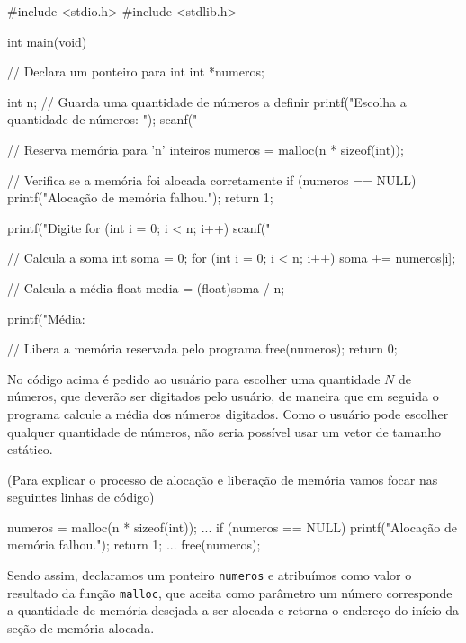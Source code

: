 \newpage
\begin{excode}
    #include <stdio.h>
    #include <stdlib.h>

    int main(void)
    {
        // Declara um ponteiro para int
        int *numeros;
        
        int n; // Guarda uma quantidade de números a definir
        printf("Escolha a quantidade de números: ");
        scanf("%
        
        // Reserva memória para 'n' inteiros
        numeros = malloc(n * sizeof(int));
        
        // Verifica se a memória foi alocada corretamente
        if (numeros == NULL) {
            printf("Alocação de memória falhou.\n");
            return 1;
        }
        
        printf("Digite %
        for (int i = 0; i < n; i++) {
            scanf("%
        }
        
        // Calcula a soma
        int soma = 0;
        for (int i = 0; i < n; i++) {
            soma += numeros[i];
        }
        
        // Calcula a média
        float media = (float)soma / n;
        
        printf("Média: %
        
        // Libera a memória reservada pelo programa
        free(numeros);
        return 0;
    }
\end{excode}
\newpage

No código acima é pedido ao usuário para escolher uma quantidade \(N\) de 
números, que deverão ser digitados pelo usuário, de maneira que em seguida o 
programa calcule a média dos números digitados. Como o usuário pode escolher 
qualquer quantidade de números, não seria possível usar um vetor de tamanho 
estático.

(Para explicar o processo de alocação e liberação de memória vamos focar nas 
seguintes linhas de código)

\begin{excode}
    numeros = malloc(n * sizeof(int));
    ...
    if (numeros == NULL) {
        printf("Alocação de memória falhou.\n");
        return 1;
    }
    ...
    free(numeros);
\end{excode}

Sendo assim, declaramos um ponteiro \texttt{numeros} e atribuímos como valor o 
resultado da  função \texttt{malloc}, que aceita como parâmetro um número 
corresponde a quantidade de memória desejada a ser alocada e retorna o endereço 
do início da seção de memória alocada.

